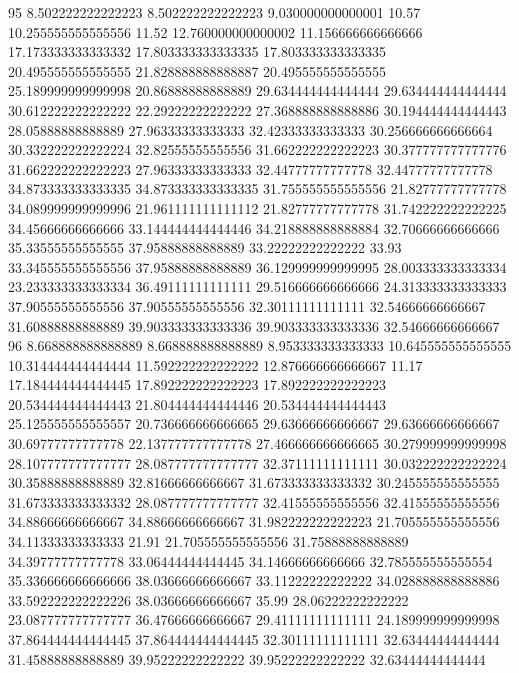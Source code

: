 95 8.502222222222223 8.502222222222223 9.030000000000001 10.57 10.255555555555556 11.52 12.760000000000002 11.156666666666666 17.173333333333332 17.803333333333335 17.803333333333335 20.495555555555555 21.828888888888887 20.495555555555555 25.189999999999998 20.86888888888889 29.634444444444444 29.634444444444444 30.612222222222222 22.29222222222222 27.368888888888886 30.194444444444443 28.05888888888889 27.96333333333333 32.42333333333333 30.256666666666664 30.332222222222224 32.82555555555556 31.662222222222223 30.377777777777776 31.662222222222223 27.96333333333333 32.44777777777778 32.44777777777778 34.873333333333335 34.873333333333335 31.755555555555556 21.82777777777778 34.089999999999996 21.961111111111112 21.82777777777778 31.742222222222225 34.45666666666666 33.144444444444446 34.218888888888884 32.70666666666666 35.33555555555555 37.95888888888889 33.22222222222222 33.93 33.345555555555556 37.95888888888889 36.129999999999995 28.003333333333334 23.233333333333334 36.49111111111111 29.516666666666666 24.313333333333333 37.90555555555556 37.90555555555556 32.30111111111111 32.54666666666667 31.60888888888889 39.903333333333336 39.903333333333336 32.54666666666667
96 8.668888888888889 8.668888888888889 8.953333333333333 10.645555555555555 10.314444444444444 11.592222222222222 12.876666666666667 11.17 17.184444444444445 17.892222222222223 17.892222222222223 20.534444444444443 21.804444444444446 20.534444444444443 25.125555555555557 20.736666666666665 29.63666666666667 29.63666666666667 30.69777777777778 22.137777777777778 27.466666666666665 30.279999999999998 28.107777777777777 28.087777777777777 32.37111111111111 30.032222222222224 30.35888888888889 32.81666666666667 31.673333333333332 30.245555555555555 31.673333333333332 28.087777777777777 32.41555555555556 32.41555555555556 34.88666666666667 34.88666666666667 31.982222222222223 21.705555555555556 34.11333333333333 21.91 21.705555555555556 31.75888888888889 34.39777777777778 33.06444444444445 34.14666666666666 32.785555555555554 35.336666666666666 38.03666666666667 33.11222222222222 34.028888888888886 33.592222222222226 38.03666666666667 35.99 28.06222222222222 23.087777777777777 36.47666666666667 29.41111111111111 24.189999999999998 37.864444444444445 37.864444444444445 32.30111111111111 32.63444444444444 31.45888888888889 39.95222222222222 39.95222222222222 32.63444444444444
